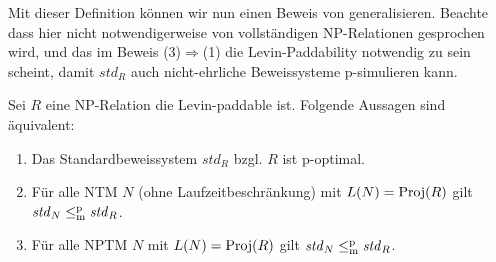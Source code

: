 Mit dieser Definition können wir nun einen Beweis von \textcite[Thm. 5.2]{messner_simulation_2001} generalisieren. Beachte dass hier nicht notwendigerweise von vollständigen NP-Relationen gesprochen wird, und das im Beweis (3)$\Rightarrow$(1) die Levin-Paddability notwendig zu sein scheint, damit $\mathit{std}_R$ auch nicht-ehrliche Beweissysteme p-simulieren kann.
\begin{lemma}\label{lemma:stdps-q}
    Sei $R$ eine NP-Relation die Levin-paddable ist. Folgende Aussagen sind äquivalent:
    \begin{enumerate}
        \item Das Standardbeweissystem $\mathit{std}_R$ bzgl. $R$ ist p-optimal.
        \item Für alle NTM $N$ (ohne Laufzeitbeschränkung) mit $L(N)=\operatorname{Proj}(R)$ gilt $\mathit{std}_N\leq_\mathrm{m}^\mathrm{p}\mathit{std}_R$.
        \item Für alle NPTM $N$  mit $L(N)=\operatorname{Proj}(R)$ gilt $\mathit{std}_N\leq_\mathrm{m}^\mathrm{p}\mathit{std}_R$.
    \end{enumerate}
\end{lemma}
